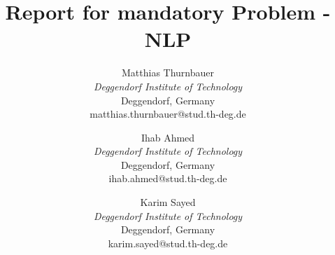 \documentclass[onecolumn]{article}
\begin{document}
\title{Report for mandatory Problem - NLP}

\author{
Matthias Thurnbauer\\
\textit{Deggendorf Institute of Technology} \\
Deggendorf, Germany \\
matthias.thurnbauer@stud.th-deg.de
\and
Ihab Ahmed\\
\textit{Deggendorf Institute of Technology} \\
Deggendorf, Germany \\
ihab.ahmed@stud.th-deg.de
\and
Karim Sayed\\
\textit{Deggendorf Institute of Technology} \\
Deggendorf, Germany \\
karim.sayed@stud.th-deg.de
}

\maketitle







\printbibliography
\end{document}
